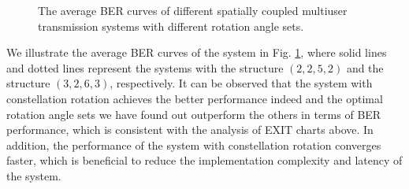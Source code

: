 \documentclass[conference]{IEEEtran}
\begin{document}
\begin{figure}[h!]
\setlength{\abovecaptionskip}{0.cm}
\setlength{\belowcaptionskip}{-0.cm}
  \caption{The average BER curves of different spatially coupled multiuser transmission systems with different rotation angle sets.}\label{fig.8}
    \vspace{-1em}
\end{figure}
We illustrate the average BER curves of the system in Fig. \ref{fig.8}, where solid lines and dotted lines represent the systems with the structure $\left( {2,2,5,2} \right)$ and the structure $\left( {3,2,6,3} \right)$, respectively. It can be observed that the system with constellation rotation achieves the better performance indeed and the optimal rotation angle sets we have found out outperform the others in terms of BER performance, which is consistent with the analysis of EXIT charts above. In addition, the performance of the system with constellation rotation converges faster, which is beneficial to reduce the implementation complexity and latency of the system.
\end{document}
